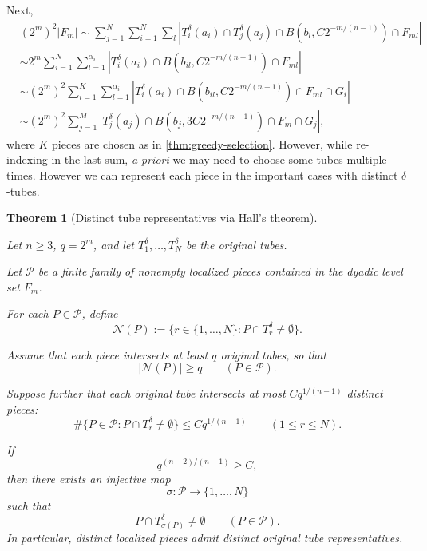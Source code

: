 \documentclass[11pt, letterpaper]{nyjm}
\newtheorem{theorem}{Theorem}[section]
\begin{document}
	Next,
	\begin{equation} \label{eq:final3}
		\begin{aligned}	
			&(2^m)^2|F_m| \sim \sum_{j=1}^{N}\sum_{i=1}^{N}\sum_{l}|T^\delta_i(a_i) \cap T^\delta_j(a_j)\cap B(b_{l},C2^{-m/(n-1)}) \cap F_{ml}| \\ 
			&\sim 2^m\sum_{i=1}^{N}\sum_{l=1}^{\alpha_i}|T^\delta_i(a_i) \cap B(b_{il},C2^{-m/(n-1)}) \cap F_{ml}| \\
			&\sim (2^m)^2\sum_{i=1}^{K}\sum_{l=1}^{\alpha_i}|T^\delta_i(a_i) \cap B(b_{il},C2^{-m/(n-1)}) \cap F_{ml} \cap G_i| \\
			&\sim  (2^{m})^2\sum_{j=1}^{M}|T^\delta_j(a_j) \cap B(b_{j},3C2^{-m/(n-1)}) \cap F_m \cap G_j|,		
		\end{aligned}
	\end{equation}
	where $K$ pieces are chosen as in \ref{thm:greedy-selection}. However, while  re-indexing in the last sum, \emph{a priori} we may need to choose some tubes multiple times.
	However we can represent each piece in the important cases with distinct $\delta$-tubes. 
	\begin{theorem}[Distinct tube representatives via Hall's theorem]
		\label{thm:hall-representatives}
		
		Let $n\ge 3$, $q=2^m$, and let
		$T_1^\delta,\ldots,T_N^\delta$ be the original tubes.
		
		Let $\mathcal P$ be a finite family of nonempty
		localized pieces contained in the dyadic level set $F_m$.
		
		
		For each $P\in\mathcal P$, define
		\[
		\mathcal N(P)
		:=
		\{r\in\{1,\ldots,N\}:
		P\cap T_r^\delta\neq\emptyset\}.
		\]
		
		Assume that each piece intersects at least $q$ original
		tubes, so that
		\[
		|\mathcal N(P)|\ge q
		\qquad(P\in\mathcal P).
		\]
		
		Suppose further that each original tube intersects
		at most $Cq^{1/(n-1)}$ distinct pieces:
		\[
		\#\{P\in\mathcal P:
		P\cap T_r^\delta\neq\emptyset\}
		\le Cq^{1/(n-1)}
		\qquad(1\le r\le N).
		\]
		
		If
		\[
		q^{(n-2)/(n-1)}\ge C,
		\]
		then there exists an injective map
		\[
		\sigma:\mathcal P\longrightarrow\{1,\ldots,N\}
		\]
		such that
		\[
		P\cap T_{\sigma(P)}^\delta\neq\emptyset
		\qquad(P\in\mathcal P).
		\]
		In particular, distinct localized pieces admit
		distinct original tube representatives.
	\end{theorem}
	
\end{document}
